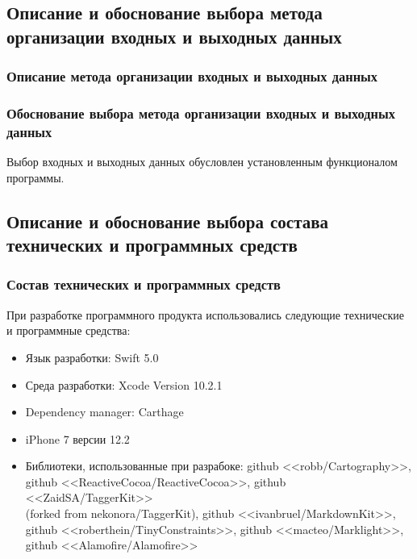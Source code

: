 \documentclass[a4paper,12pt]{article}
\begin{document}
	\subsection{Описание и обоснование выбора метода организации входных и выходных данных}
	
	\subsubsection{Описание метода организации входных и выходных данных}
	
	
	
	

	\subsubsection{Обоснование выбора метода организации входных и выходных данных}
	
	Выбор входных и выходных данных обусловлен установленным функционалом программы.
	
	
	\subsection{Описание и обоснование выбора состава технических и программных средств}
	
	
	\subsubsection{Состав технических и программных средств}
	При разработке программного продукта использовались следующие технические и программные средства:
	\begin{itemize}
		\item Язык разработки: Swift 5.0
		\item Среда разработки: Xcode Version 10.2.1
		\item Dependency manager: Carthage
		\item iPhone 7 версии 12.2
		\item Библиотеки, использованные при разрабоке: github <<robb/Cartography>>, github <<ReactiveCocoa/ReactiveCocoa>>, github <<ZaidSA/TaggerKit>> \\ (forked from nekonora/TaggerKit), github <<ivanbruel/MarkdownKit>>, \\ github <<roberthein/TinyConstraints>>, github <<macteo/Marklight>>,\\ github <<Alamofire/Alamofire>>
	\end{itemize}
\end{document}
